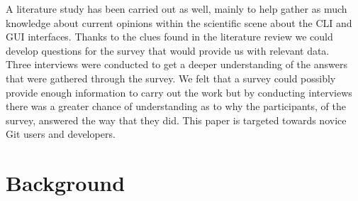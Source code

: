 \documentclass[a4paper,oneside]{bth} %
\begin{document}
		A literature study has been carried out as well, mainly to help  gather as much knowledge about current opinions within the scientific scene about the CLI and GUI interfaces.
		Thanks to the clues found in the literature review we could develop questions for the survey that would provide us with relevant data.\\
		Three interviews were conducted to get a deeper understanding of the answers that were gathered through the survey.
		We felt that a survey could possibly provide enough information to carry out the work but by conducting interviews there was a greater chance of understanding as to why the participants, of the survey, answered the way that they did.
		This paper is targeted towards novice Git users and developers.
		
		\chapter{Background}
\end{document}
